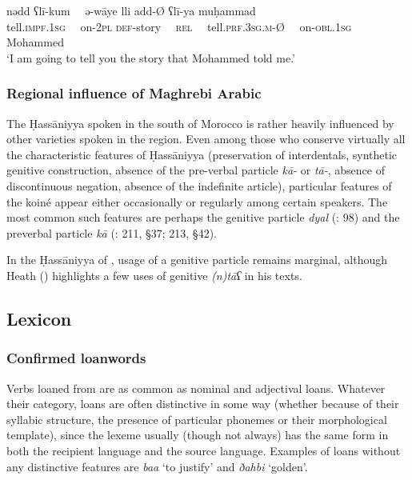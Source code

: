 \documentclass[output=paper]{langsci/langscibook}
\begin{document}
\ea
\gll n{\R}ədd ʕlī-kum~~ ə{\R}-{\R}wāye lli {\R}add-Ø ʕlī-ya muḥammad\\
 tell.\textsc{impf.}1\textsc{sg}~~ on-2\textsc{pl} \textsc{def-}story~~ \textsc{rel}~~ tell.\textsc{prf.3sg.m-}Ø~~ on-\textsc{obl.1sg} Mohammed\\
\glt ‘I am going to tell you the story that Mohammed told me.’ 
\z

\subsubsection{Regional influence of Maghrebi Arabic} %

The Ḥassāniyya spoken in the south of Morocco is rather heavily influenced by other  varieties spoken in the region. Even among those who conserve virtually all the characteristic features of Ḥassāniyya (preservation of interdentals, synthetic genitive construction, absence of the pre-verbal particle \textit{kā-} or \textit{tā-}, absence of discontinuous {negation}, absence of the {indefinite article}), particular features of the   koiné appear either occasionally or regularly among certain speakers. The most common such features are perhaps the genitive particle \textit{dyal} (\citealt{Taine-Cheikh1997socio}: 98) and the preverbal particle \textit{kā} (\citealt{Aguadé1998}: 211, §37; 213, §42).

In the Ḥassāniyya of , usage of a genitive particle remains marginal, although Heath (\citeyear[162]{Heath2004}) highlights a few uses of genitive \textit{(n)tāʕ} in his texts.

\subsection{Lexicon} %

\subsubsection{Confirmed loanwords} %


Verbs loaned from   are as common as nominal and adjectival loans. Whatever their category, loans are often distinctive in some way (whether because of their {syllabic structure}, the presence of particular phonemes or their morphological template), since the lexeme usually (though not always) has the same form in both the {recipient language} and the {source language}. Examples of loans without any distinctive features are \textit{ba{\R}{\R}a{\R}} ‘to justify’ and \textit{ðahbi} ‘golden’. 
\end{document}
